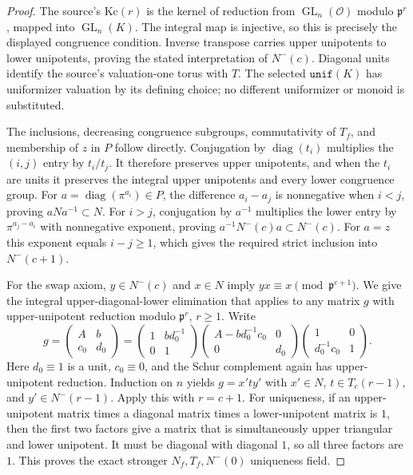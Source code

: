 \begin{proof}
The source's $\mathrm{Kc}(r)$ is the kernel of reduction from
$\operatorname{GL}_n(\mathcal O)$ modulo $\mathfrak p^r$, mapped
into $\operatorname{GL}_n(K)$.  The integral map is injective, so
this is precisely the displayed congruence condition.  Inverse
transpose carries upper unipotents to lower unipotents, proving
the stated interpretation of $N^-(c)$.  Diagonal units identify
the source's valuation-one torus with $T$.  The selected
$\texttt{unif}(K)$ has uniformizer valuation by its defining
choice; no different uniformizer or monoid is substituted.

The inclusions, decreasing congruence subgroups, commutativity
of $T_f$, and membership of $z$ in $P$ follow directly.
Conjugation by $\operatorname{diag}(t_i)$ multiplies the
$(i,j)$ entry by $t_i/t_j$.  It therefore preserves upper
unipotents, and when the $t_i$ are units it preserves the
integral upper unipotents and every lower congruence group.
For $a=\operatorname{diag}(\pi^{a_i})\in P$, the difference
$a_i-a_j$ is nonnegative when $i<j$, proving
$aNa^{-1}\subset N$.  For $i>j$, conjugation by $a^{-1}$
multiplies the lower entry by $\pi^{a_j-a_i}$ with
nonnegative exponent, proving
$a^{-1}N^-(c)a\subset N^-(c)$.  For $a=z$ this exponent
equals $i-j\geq1$, which gives the required strict inclusion
into $N^-(c+1)$.

For the swap axiom, $y\in N^-(c)$ and $x\in N$ imply
$yx\equiv x\pmod{\mathfrak p^{c+1}}$.  We give the integral
upper-diagonal-lower elimination that applies to any matrix
$g$ with upper-unipotent reduction modulo $\mathfrak p^r$,
$r\geq1$.  Write
\[
 g=\begin{pmatrix}A&b\\c_0&d_0\end{pmatrix}
   =\begin{pmatrix}1&bd_0^{-1}\\0&1\end{pmatrix}
    \begin{pmatrix}A-bd_0^{-1}c_0&0\\0&d_0\end{pmatrix}
    \begin{pmatrix}1&0\\d_0^{-1}c_0&1\end{pmatrix}.
\]
Here $d_0\equiv1$ is a unit, $c_0\equiv0$, and the Schur
complement again has upper-unipotent reduction.  Induction on
$n$ yields $g=x'ty'$ with $x'\in N$,
$t\in T_c(r-1)$, and $y'\in N^-(r-1)$.  Apply this with
$r=c+1$.  For uniqueness, if an upper-unipotent matrix times
a diagonal matrix times a lower-unipotent matrix is $1$,
then the first two factors give a matrix that is simultaneously
upper triangular and lower unipotent.  It must be diagonal
with diagonal $1$, so all three factors are $1$.  This proves
the exact stronger $N_f,T_f,N^-(0)$ uniqueness field.


\end{proof}
